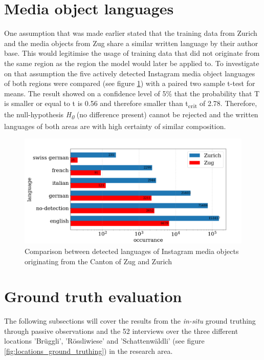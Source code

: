 \section{Media object languages}
One assumption that was made earlier stated that the training data from Zurich and the media objects from Zug share a similar written language by their author base. This would legitimise the usage of training data that did not originate from the same region as the region the model would later be applied to. To investigate on that assumption the five actively detected Instagram media object languages of both regions were compared (see figure \ref{fig:det_languages}) with a paired two sample t-test for means. The result showed on a confidence level of 5\% that the probability that T is smaller or equal to t is 0.56 and therefore smaller than t\textsubscript{crit} of 2.78. Therefore, the null-hypothesis \textit{H\textsubscript{0}} (no difference present) cannot be rejected and the written languages of both areas are with high certainty of similar composition.

\begin{figure}[h!]
   \centering
   \includegraphics[width=\textwidth]{img/det_languages_bigger_font.pdf}
   \caption{Comparison between detected languages of Instagram media objects originating from the Canton of Zug and Zurich}
   \label{fig:det_languages}
\end{figure}

\section{Ground truth evaluation}
The following subsections will cover the results from the \textit{in-situ} ground truthing through passive observations and the 52 interviews over the three different locations 'Br\"uggli', 'R\"ossliwiese' and 'Schattenw\"aldli' (see figure \ref{fig:locations_ground_truthing}) in the research area. \\

